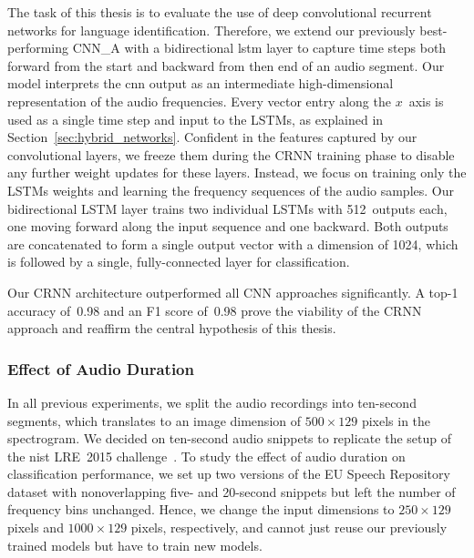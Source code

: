 The task of this thesis is to evaluate the use of deep convolutional recurrent networks for language identification. Therefore, we extend our previously best-performing CNN\_A with a bidirectional \ac{lstm} layer to capture time steps both forward from the start and backward from then end of an audio segment. Our model interprets the \ac{cnn} output as an intermediate high-dimensional representation of the audio frequencies. Every vector entry along the $x$~axis is used as a single time step and input to the LSTMs, as explained in Section~\ref{sec:hybrid_networks}. Confident in the features captured by our convolutional layers, we freeze them during the CRNN training phase to disable any further weight updates for these layers. Instead, we focus on training only the LSTMs weights and learning the frequency sequences of the audio samples. Our bidirectional LSTM layer trains two individual LSTMs with \num{512}~outputs each, one moving forward along the input sequence and one backward. Both outputs are concatenated to form a single output vector with a dimension of \num{1024}, which is followed by a single, fully-connected layer for classification.

Our CRNN architecture outperformed all CNN approaches significantly. A top-1 accuracy of~\num{0.98} and an F1 score of~\num{0.98} prove the viability of the CRNN approach and reaffirm the central hypothesis of this thesis.


\subsubsection{Effect of Audio Duration}
\label{sec:duration}
In all previous experiments, we split the audio recordings into ten-second segments, which translates to an image dimension of $500 \times 129$ pixels in the spectrogram. We decided on ten-second audio snippets to replicate the setup of the \ac{nist} LRE~2015 challenge~\cite{lre2015}. To study the effect of audio duration on classification performance, we set up two versions of the EU Speech Repository dataset with nonoverlapping five- and \num{20}-second snippets but left the number of frequency bins unchanged. Hence, we change the input dimensions to $250 \times 129$ pixels and $1000 \times 129$ pixels, respectively, and cannot just reuse our previously trained models but have to train new models.

